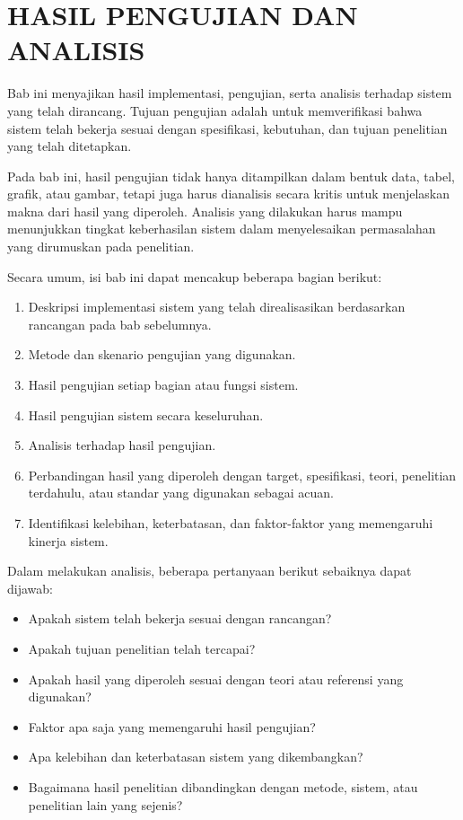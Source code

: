 \chapter{\MakeUppercase{Hasil Pengujian dan Analisis}}

Bab ini menyajikan hasil implementasi, pengujian, serta analisis terhadap sistem yang telah dirancang. Tujuan pengujian adalah untuk memverifikasi bahwa sistem telah bekerja sesuai dengan spesifikasi, kebutuhan, dan tujuan penelitian yang telah ditetapkan.

Pada bab ini, hasil pengujian tidak hanya ditampilkan dalam bentuk data, tabel, grafik, atau gambar, tetapi juga harus dianalisis secara kritis untuk menjelaskan makna dari hasil yang diperoleh. Analisis yang dilakukan harus mampu menunjukkan tingkat keberhasilan sistem dalam menyelesaikan permasalahan yang dirumuskan pada penelitian.

Secara umum, isi bab ini dapat mencakup beberapa bagian berikut:

\begin{enumerate}[topsep=0pt,itemsep=0pt,parsep=0pt,leftmargin=*]
\item Deskripsi implementasi sistem yang telah direalisasikan berdasarkan rancangan pada bab sebelumnya.
\item Metode dan skenario pengujian yang digunakan.
\item Hasil pengujian setiap bagian atau fungsi sistem.
\item Hasil pengujian sistem secara keseluruhan.
\item Analisis terhadap hasil pengujian.
\item Perbandingan hasil yang diperoleh dengan target, spesifikasi, teori, penelitian terdahulu, atau standar yang digunakan sebagai acuan.
\item Identifikasi kelebihan, keterbatasan, dan faktor-faktor yang memengaruhi kinerja sistem.
\end{enumerate}

Dalam melakukan analisis, beberapa pertanyaan berikut sebaiknya dapat dijawab:

\begin{itemize}[topsep=0pt,itemsep=0pt,parsep=0pt,leftmargin=*]
\item Apakah sistem telah bekerja sesuai dengan rancangan?
\item Apakah tujuan penelitian telah tercapai?
\item Apakah hasil yang diperoleh sesuai dengan teori atau referensi yang digunakan?
\item Faktor apa saja yang memengaruhi hasil pengujian?
\item Apa kelebihan dan keterbatasan sistem yang dikembangkan?
\item Bagaimana hasil penelitian dibandingkan dengan metode, sistem, atau penelitian lain yang sejenis?
\end{itemize}

